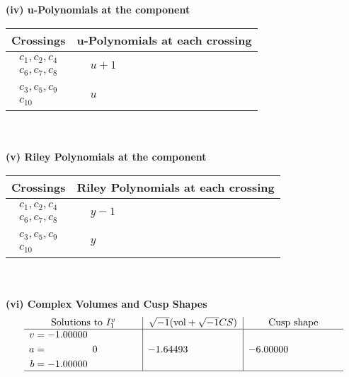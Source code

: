\documentclass[1p]{elsarticle_modified}
\theoremstyle{definition}
\newcommand{\I}{\sqrt{-1}}
\begin{document}
\newpage\renewcommand{\arraystretch}{1}
\flushleft \textbf{(iv) u-Polynomials at the component}\newline \\
\begin{tabular}{m{50pt}|m{274pt}}
Crossings & \hspace{64pt}u-Polynomials at each crossing \\
\hline $$\begin{aligned}c_{1},c_{2},c_{4}\\c_{6},c_{7},c_{8}\end{aligned}$$&$\begin{aligned}
&u+1
\end{aligned}$\\
\hline $$\begin{aligned}c_{3},c_{5},c_{9}\\c_{10}\end{aligned}$$&$\begin{aligned}
&u
\end{aligned}$\\
\hline
\end{tabular}\\~\\
\newpage\renewcommand{\arraystretch}{1}
\flushleft \textbf{(v) Riley Polynomials at the component}\newline \\
\begin{tabular}{m{50pt}|m{274pt}}
Crossings & \hspace{64pt}Riley Polynomials at each crossing \\
\hline $$\begin{aligned}c_{1},c_{2},c_{4}\\c_{6},c_{7},c_{8}\end{aligned}$$&$\begin{aligned}
&y-1
\end{aligned}$\\
\hline $$\begin{aligned}c_{3},c_{5},c_{9}\\c_{10}\end{aligned}$$&$\begin{aligned}
&y
\end{aligned}$\\
\hline
\end{tabular}\\~\\
\newpage\flushleft \textbf{(vi) Complex Volumes and Cusp Shapes}
$$\begin{array}{c|c|c}  
\text{Solutions to }I^v_{1}& \I (\text{vol} + \sqrt{-1}CS) & \text{Cusp shape}\\
 \hline 
\begin{aligned}
v &= -1.00000\phantom{ +0.000000I} \\
a &= \phantom{-0.000000 } 0 \\
b &= -1.00000\phantom{ +0.000000I}\end{aligned}
 & -1.64493\phantom{ +0.000000I} & -6.00000\phantom{ +0.000000I}\\
 \hline 
 \end{array}$$\newpage
\end{document}
